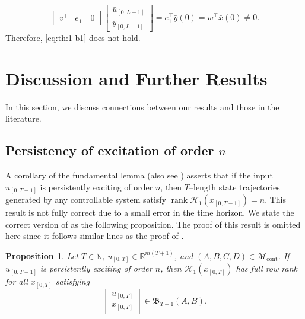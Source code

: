 \documentclass[journal,twoside,web]{ieeecolor}
\newtheorem{proposition}[theorem]{Proposition}
\DeclareMathOperator{\rank}{rank}
\begin{document}
\begin{equation}
\begin{bmatrix}
v^\top & e_1^\top & 0 
\end{bmatrix}\begin{bmatrix}
\bar{u}_{[0,L-1]} \\ \bar{y}_{[0,L-1]}
\end{bmatrix}=e_1^\top \bar{y}(0)=w^\top \bar{x}(0)\neq 0.
\end{equation}
Therefore, \eqref{eq:th:1-b1} does not hold. \hfill \QED

\section{Discussion and Further Results}
\label{sec:IV}

In this section, we discuss connections between our results and those in the literature. 

\subsection{Persistency of excitation of order $n$}

A corollary of the fundamental lemma \cite[Cor. 2(i)]{willems2005note} (also see \cite[Cor. 3(1)]{markovsky2021behavioral}) asserts that if the input $u_{[0,T-1]}$ is persistently exciting of order $n$, then $T$--length state trajectories generated by any controllable system satisfy $\rank\mathcal{H}_1(x_{[0,T-1]})=n$. This result is not fully correct due to a small error in the time horizon. We state the correct version of \cite[Cor. 2(i)]{willems2005note} as the following proposition. The proof of this result is omitted here since it follows similar lines as the proof of \cite[Thm. 1]{van2020willems}. 

\begin{proposition}
\label{prop:cor}
Let $T\in\mathbb{N}$, $u_{[0,T]}\in\mathbb{R}^{m(T+1)}$, and $(A,B,C,D)\in\mathcal{M}_\text{cont}$. If $u_{[0,T-1]}$ is persistently exciting of order $n$, then $\mathcal{H}_1(x_{[0,T]})$ has full row rank for all $x_{[0,T]}$ satisfying
\begin{equation}
\begin{bmatrix}
\label{eq:prop:cor}
u_{[0,T]} \\ x_{[0,T]}
\end{bmatrix}\in\mathfrak{B}_{T+1}(A,B).
\end{equation}%

\end{proposition}
\end{document}
